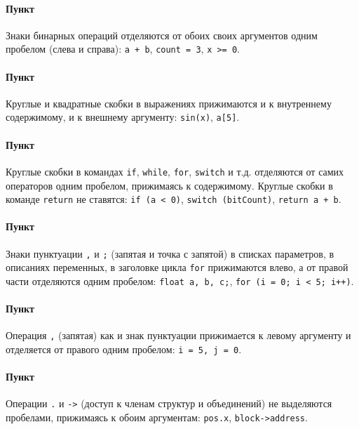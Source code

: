 \paragraph{Пункт}

Знаки бинарных операций отделяются от обоих своих аргументов одним
пробелом (слева и справа): \texttt{a\ +\ b}, \texttt{count\ =\ 3},
\texttt{x\ \textgreater{}=\ 0}.

\paragraph{Пункт}

Круглые и квадратные скобки в выражениях прижимаются и к внутреннему
содержимому, и к внешнему аргументу: \texttt{sin(x)}, \texttt{a{[}5{]}}.

\paragraph{Пункт}

Круглые скобки в командах \texttt{if}, \texttt{while}, \texttt{for},
\texttt{switch} и т.д. отделяются от самих операторов одним пробелом,
прижимаясь к содержимому. Круглые скобки в команде \texttt{return} не
ставятся: \texttt{if\ (a\ \textless{}\ 0)}, \texttt{switch\ (bitCount)},
\texttt{return\ a\ +\ b}.

\paragraph{Пункт}

Знаки пунктуации \texttt{,} и \texttt{;} (запятая и точка с запятой) в
списках параметров, в описаниях переменных, в заголовке цикла
\texttt{for} прижимаются влево, а от правой части отделяются одним
пробелом: \texttt{float\ a,\ b,\ c;},
\texttt{for\ (i\ =\ 0;\ i\ \textless{}\ 5;\ i++)}.

\paragraph{Пункт}

Операция \texttt{,} (запятая) как и знак пунктуации прижимается к левому
аргументу и отделяется от правого одним пробелом:
\texttt{i\ =\ 5,\ j\ =\ 0}.

\paragraph{Пункт}

Операции \texttt{.} и \texttt{-\textgreater{}} (доступ к членам структур
и объединений) не выделяются пробелами, прижимаясь к обоим аргументам:
\texttt{pos.x}, \texttt{block-\textgreater{}address}.

